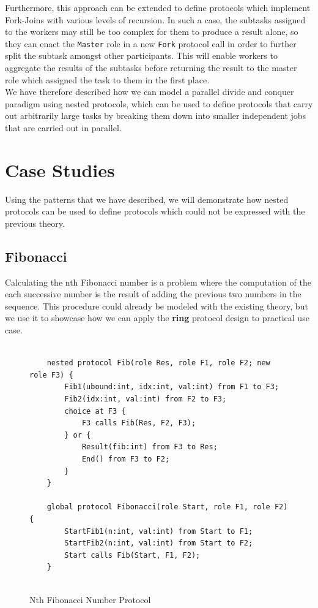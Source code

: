 \documentclass[12pt,twoside]{report}
\begin{document}
Furthermore, this approach can be extended to define protocols which implement Fork-Joins with various levels of recursion. In such a case, the subtasks assigned to the workers may still be too complex for them to produce a result alone, so they can enact the \texttt{Master} role in a new \texttt{Fork} protocol call in order to further split the subtask amongst other participants. This will enable workers to aggregate the results of the subtasks before returning the result to the master role which assigned the task to them in the first place.\\

We have therefore described how we can model a parallel divide and conquer paradigm using nested protocols, which can be used to define protocols that carry out arbitrarily large tasks by breaking them down into smaller independent jobs that are carried out in parallel.

\section{Case Studies}

Using the patterns that we have described, we will demonstrate how nested protocols can be used to define protocols which could not be expressed with the previous theory.

\subsection{Fibonacci}

Calculating the nth Fibonacci number is a problem where the computation of the each successive number is the result of adding the previous two numbers in the sequence. This procedure could already be modeled with the existing theory\cite{parametrictypes}, but we use it to showcase how we can apply the \textbf{ring} protocol design to practical use case.

\begin{figure}[htb!]
    \centering
    \lstset{language=Scribble}
    \begin{lstlisting}
    
    nested protocol Fib(role Res, role F1, role F2; new role F3) {
        Fib1(ubound:int, idx:int, val:int) from F1 to F3;
        Fib2(idx:int, val:int) from F2 to F3;
        choice at F3 {
            F3 calls Fib(Res, F2, F3);
        } or {
            Result(fib:int) from F3 to Res;
            End() from F3 to F2;
        }
    }
    
    global protocol Fibonacci(role Start, role F1, role F2) {
        StartFib1(n:int, val:int) from Start to F1;
        StartFib2(n:int, val:int) from Start to F2;
        Start calls Fib(Start, F1, F2);
    }
        
    \end{lstlisting}
    \caption{Nth Fibonacci Number Protocol}
    \label{fibonacci-protocol}
\end{figure}
\end{document}
